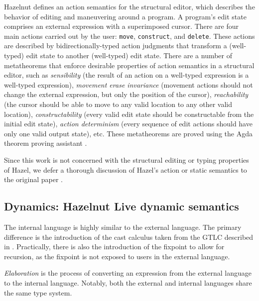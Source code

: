 Hazelnut defines an action semantics for the structural editor, which describes the behavior of editing and maneuvering around a program. A program's edit state comprises an external expression with a superimposed cursor. There are four main actions carried out by the user: \texttt{move}, \texttt{construct}, and \texttt{delete}. These actions are described by bidirectionally-typed action judgments that transform a (well-typed) edit state to another (well-typed) edit state. There are a number of metatheorems that enforce desirable properties of action semantics in a structural editor, such as \textit{sensibility} (the result of an action on a well-typed expression is a well-typed expression), \textit{movement erase invariance} (movement actions should not change the external expression, but only the position of the cursor), \textit{reachability} (the cursor should be able to move to any valid location to any other valid location), \textit{constructability} (every valid edit state should be constructable from the initial edit state), \textit{action determinism} (every sequence of edit actions should have only one valid output state), etc. These metatheorems are proved using the Agda theorem proving assistant \cite{agda2017}.

Since this work is not concerned with the structural editing or typing properties of Hazel, we defer a thorough discussion of Hazel's action or static semantics to the original paper \cite{conf/popl/Hazelnut17}.


\subsection{Dynamics: Hazelnut Live dynamic semantics}
\label{sec:hazel-dynamics}


The internal language is highly similar to the external language. The primary difference is the introduction of the cast calculus taken from the GTLC described in . Practically, there is also the introduction of the fixpoint to allow for recursion, as the fixpoint is not exposed to users in the external language.

\textit{Elaboration} is the process of converting an expression from the external language to the internal language. Notably, both the external and internal languages share the same type system.

